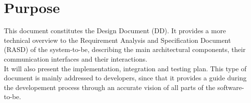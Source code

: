 \documentclass[../../DD.tex]{subfiles}
\begin{document}
\section{Purpose\label{sect:1.1}}
This document constitutes the Design Document (DD). It provides a more technical overview to the Requirement Analysis and Specification Document (RASD) of the system-to-be, describing the main architectural components, their communication interfaces and their interactions.\\
It will also present the implementation, integration and testing plan. This type of document is mainly addressed to developers, since that it provides a guide during the developement process through an accurate vision of all parts of the software-to-be.
\end{document}
